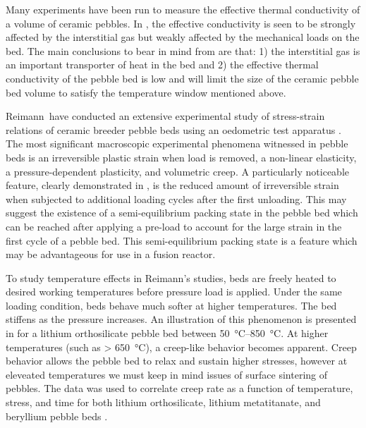 Many experiments have been run to measure the effective thermal conductivity of a volume of ceramic pebbles. In , the effective conductivity is seen to be strongly affected by the interstitial gas but weakly affected by the mechanical loads on the bed. The main conclusions to bear in mind from  are that: 1) the interstitial gas is an important transporter of heat in the bed and 2) the effective thermal conductivity of the pebble bed is low and will limit the size of the ceramic pebble bed volume to satisfy the temperature window mentioned above.



Reimann\etal~have conducted an extensive experimental study of stress-strain relations of ceramic breeder pebble beds using an oedometric test apparatus \cite{Piazza2002811,Reimann:2002kl,Reimann:2003qc,Reimann:2002mi,Reimann:2001il}. The most significant macroscopic experimental phenomena witnessed in pebble beds is an irreversible plastic strain when load is removed, a non-linear elasticity, a pressure-dependent plasticity, and volumetric creep.  A particularly noticeable feature, clearly demonstrated in , is the reduced amount of irreversible strain when subjected to additional loading cycles after the first unloading. This may suggest the existence of a semi-equilibrium packing state in the pebble bed which can be reached after applying a pre-load to account for the large strain in the first cycle of a pebble bed. This semi-equilibrium packing state is a feature which may be advantageous for use in a fusion reactor.

To study temperature effects in Reimann's studies, beds are freely heated to desired working temperatures before pressure load is applied. Under the same loading condition, beds behave much softer at higher temperatures. The bed stiffens as the pressure increases. An illustration of this phenomenon is presented in  for a lithium orthosilicate pebble bed between \SIrange{50}{850}{\celsius}. At higher temperatures (such as > \SI{650}{\celsius}), a creep-like behavior becomes apparent. Creep behavior allows the pebble bed to relax and sustain higher stresses, however at eleveated temperatures we must keep in mind issues of surface sintering of pebbles. The data was used to correlate creep rate as a function of temperature, stress, and time for both lithium orthosilicate, lithium metatitanate, and beryllium pebble beds \cite{Buhler:2002qf,Reimann:2001il,Reimann2005}.


